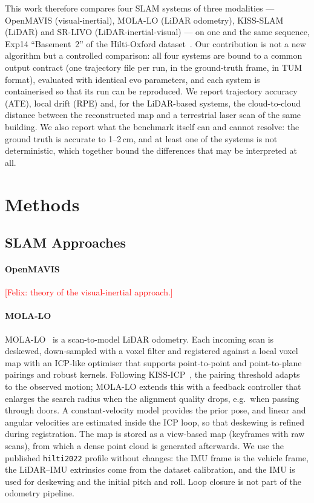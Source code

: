 \documentclass[conference]{IEEEtran}
\newcommand{\todo}[1]{\textcolor{red}{[#1]}}
\begin{document}
This work therefore compares four SLAM systems of three modalities --- OpenMAVIS
(visual-inertial), MOLA-LO (LiDAR odometry), KISS-SLAM (LiDAR) and SR-LIVO
(LiDAR-inertial-visual) --- on one and the same sequence, Exp14 ``Basement~2'' of the
Hilti-Oxford dataset~\cite{zhang2023hilti}. Our contribution is not a new algorithm but a
controlled comparison: all four systems are bound to a common output contract (one
trajectory file per run, in the ground-truth frame, in TUM format), evaluated with identical
evo parameters, and each system is containerised so that its run can be reproduced. We
report trajectory accuracy (ATE), local drift (RPE) and, for the LiDAR-based systems, the
cloud-to-cloud distance between the reconstructed map and a terrestrial laser scan of the
same building. We also report what the benchmark itself can and cannot resolve: the
ground truth is accurate to 1--2\,cm, and at least one of the systems is not deterministic,
which together bound the differences that may be interpreted at all.

\section{Methods}
\subsection{SLAM Approaches}
\paragraph*{OpenMAVIS} \todo{Felix: theory of the visual-inertial approach.}

\paragraph*{MOLA-LO}
MOLA-LO~\cite{blanco2025mola} is a scan-to-model LiDAR odometry. Each incoming scan is
deskewed, down-sampled with a voxel filter and registered against a local voxel map with an
ICP-like optimiser that supports point-to-point and point-to-plane pairings and robust kernels.
Following KISS-ICP~\cite{vizzo2023kiss}, the pairing threshold adapts to the observed motion;
MOLA-LO extends this with a feedback controller that enlarges the search radius when the
alignment quality drops, e.g.\ when passing through doors. A constant-velocity model provides
the prior pose, and linear and angular velocities are estimated inside the ICP loop, so that
deskewing is refined during registration. The map is stored as a view-based map (keyframes with
raw scans), from which a dense point cloud is generated afterwards. We use the published
\texttt{hilti2022} profile without changes: the IMU frame is the vehicle frame, the
LiDAR--IMU extrinsics come from the dataset calibration, and the IMU is used for deskewing
and the initial pitch and roll. Loop closure is not part of the odometry pipeline.
\end{document}
